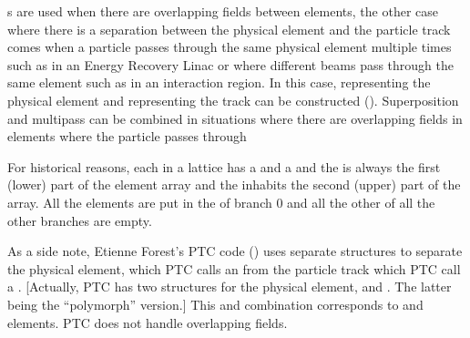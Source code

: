 s are used when there are overlapping fields between
elements, the other case where there is a separation between the
physical element and the particle track comes when a particle passes
through the same physical element multiple times such as in an Energy
Recovery Linac or where different beams pass through the same element
such as in an interaction region. In this case, 
representing the physical element and 
representing the track can be constructed ().
Superposition and multipass can be combined in situations where there
are overlapping fields in elements where the particle passes through

For historical reasons, each  in a lattice has a
 and a  and the  is always the first (lower) part of the element array and the
 inhabits the second (upper) part of the array.  All
the  elements are put in the  of branch 0
and all the other  of all the other branches are
empty.

As a side note, Etienne Forest's PTC code () uses separate
structures to separate the physical element, which PTC calls an
 from the particle track which PTC call a .
[Actually, PTC has two structures for the physical element,
 and . The latter being the ``polymorph''
version.] This  and  combination corresponds to
\bmad {} and  elements. PTC does
not handle overlapping fields.

